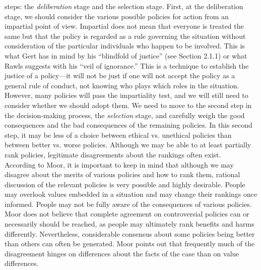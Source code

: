 \documentclass[12pt]{article}
\theoremstyle{definition}
\begin{document}
steps: the \textit{deliberation} stage and the selection stage. First, at the deliberation stage, we
should consider the various possible policies for action from an impartial point of view.
Impartial does not mean that everyone is treated the same but that the policy is
regarded as a rule governing the situation without consideration of the particular
individuals who happen to be involved. This is what Gert has in mind by his “blindfold
of justice” (see Section 2.1.1) or what Rawls suggests with his “veil of ignorance.” This
is a technique to establish the justice of a policy—it will not be just if one will not accept
the policy as a general rule of conduct, not knowing who plays which roles in the
situation.\\
However, many policies will pass the impartiality test, and we will still need to
consider whether we should adopt them. We need to move to the second step in the decision-making process, the \textit{selection} stage, and carefully weigh the good consequences
and the bad consequences of the remaining policies. In this second step, it may be less of a
choice between ethical vs. unethical policies than between better vs. worse policies.
Although we may be able to at least partially rank policies, legitimate disagreements
about the rankings often exist.\\
According to Moor, it is important to keep in mind that although we may disagree
about the merits of various policies and how to rank them, rational discussion of the
relevant policies is very possible and highly desirable. People may overlook values
embedded in a situation and may change their rankings once informed. People may not
be fully aware of the consequences of various policies. Moor does not believe that
complete agreement on controversial policies can or necessarily should be reached, as
people may ultimately rank benefits and harms differently. Nevertheless, considerable
consensus about some policies being better than others can often be generated. Moor
points out that frequently much of the disagreement hinges on differences about the
facts of the case than on value differences.
\end{document}
